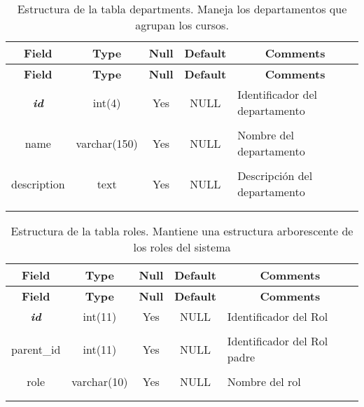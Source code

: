 %
%
\begin{longtable}{c c c c l}
	\multicolumn{1}{c}{\textbf{Field}} &
	\multicolumn{1}{c}{\textbf{Type}} &
	\multicolumn{1}{c}{\textbf{Null}} &
	\multicolumn{1}{c}{\textbf{Default}} &
	\multicolumn{1}{c}{\textbf{Comments}} \\ \hline \hline
\endfirsthead
	\multicolumn{1}{c}{\textbf{Field}} &
	\multicolumn{1}{c}{\textbf{Type}} &
	\multicolumn{1}{c}{\textbf{Null}} &
	\multicolumn{1}{c}{\textbf{Default}} &
	\multicolumn{1}{c}{\textbf{Comments}} \\ \hline \hline
\endhead \endfoot
	\textbf{\textit{id}} & int(4) & Yes & NULL & \parbox[t]{0.35\textwidth}{Identificador del departamento} \\ \\  \hline
	name & varchar(150) & Yes & NULL & \parbox[t]{0.35\textwidth}{Nombre del departamento} \\ \\  \hline
	description & text & Yes & NULL & \parbox[t]{0.35\textwidth}{Descripción del departamento} \\ \\  \hline
\caption[Estructura de la tabla departments]{Estructura de la tabla departments. Maneja los departamentos que agrupan los cursos.} \label{tab:departments-structure} \\ 
\end{longtable}

%
%
\begin{longtable}{c c c c l}
	\multicolumn{1}{c}{\textbf{Field}} &
	\multicolumn{1}{c}{\textbf{Type}} &
	\multicolumn{1}{c}{\textbf{Null}} &
	\multicolumn{1}{c}{\textbf{Default}} &
	\multicolumn{1}{c}{\textbf{Comments}} \\ \hline \hline
\endfirsthead
	\multicolumn{1}{c}{\textbf{Field}} &
	\multicolumn{1}{c}{\textbf{Type}} &
	\multicolumn{1}{c}{\textbf{Null}} &
	\multicolumn{1}{c}{\textbf{Default}} &
	\multicolumn{1}{c}{\textbf{Comments}} \\ \hline \hline
\endhead \endfoot
	\textbf{\textit{id}} & int(11)  & Yes & NULL & \parbox[t]{0.35\textwidth}{Identificador del Rol} \\ \\ \hline 
	parent\_id & int(11) & Yes & NULL & \parbox[t]{0.35\textwidth}{Identificador del Rol padre} \\ \\ \hline 
	role & varchar(10) & Yes & NULL & \parbox[t]{0.35\textwidth}{Nombre del rol} \\ \\ 
 \caption[Estructura de la tabla roles]{Estructura de la tabla roles. Mantiene una estructura arborescente de los roles del sistema} \label{tab:roles-structure} \\
\end{longtable}

